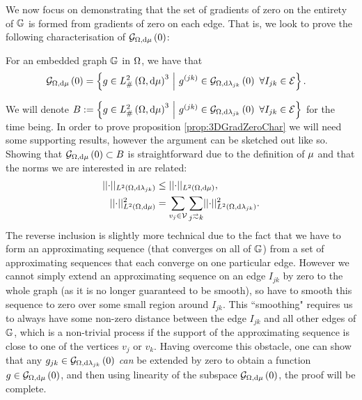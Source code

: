 We now focus on demonstrating that the set of gradients of zero on the entirety of $\mathbb{G}$ is formed from gradients of zero on each edge.
That is, we look to prove the following characterisation of $\mathcal{G}_{ \Omega, \mathrm{d}\mu}\left( 0 \right)$:
\begin{prop} \label{prop:3DGradZeroChar}
	For an embedded graph $\mathbb{G}$ in $\Omega$, we have that
	\begin{align*}
		\mathcal{G}_{ \Omega, \mathrm{d}\mu}\left( 0 \right) &= \left\{  g\in L^2_{\#}\left( \Omega,\mathrm{d} \mu \right)^3 \ \middle\vert \  g^{(jk)}\in\mathcal{G}_{ \Omega, \mathrm{d}\lambda_{jk}}\left( 0 \right) \ \forall I_{jk}\in\mathcal{E}  \right\}.
	\end{align*}
\end{prop}
We will denote $B := \left\{  g\in L^2_{\#}\left( \Omega,\mathrm{d} \mu \right)^3 \ \middle\vert \  g^{(jk)}\in\mathcal{G}_{ \Omega, \mathrm{d}\lambda_{jk}}\left( 0 \right) \ \forall I_{jk}\in\mathcal{E}  \right\}$ for the time being.
In order to prove proposition \ref{prop:3DGradZeroChar} we will need some supporting results, however the argument can be sketched out like so.
Showing that $\mathcal{G}_{ \Omega, \mathrm{d}\mu}\left( 0 \right)\subset B$ is straightforward due to the definition of $\mu$ and that the norms we are interested in are related:
\begin{align*}
	\norm{\cdot}_{\ltwo{\ddom}{\lambda_{jk}}} &\leq \norm{\cdot}_{\ltwo{\ddom}{\ddmes}}, \\
	\norm{\cdot}_{\ltwo{\ddom}{\ddmes}}^2 &= \sum_{v_j\in\vertSet}\sum_{j\conLeft k}\norm{\cdot}_{\ltwo{\ddom}{\lambda_{jk}}}^2.
\end{align*}
The reverse inclusion is slightly more technical due to the fact that we have to form an approximating sequence (that converges on all of $\mathbb{G}$) from a set of approximating sequences that each converge on one particular edge.
However we cannot simply extend an approximating sequence on an edge $I_{jk}$ by zero to the whole graph (as it is no longer guaranteed to be smooth), so have to smooth this sequence to zero over some small region around $I_{jk}$.
This ``smoothing" requires us to always have some non-zero distance between the edge $I_{jk}$ and all other edges of $\mathbb{G}$, which is a non-trivial process if the support of the approximating sequence is close to one of the vertices $v_j$ or $v_k$.
Having overcome this obstacle, one can show that any $g_{jk}\in\mathcal{G}_{ \Omega, \mathrm{d}\lambda_{jk}}\left( 0 \right)$ \emph{can} be extended by zero to obtain a function $g\in\mathcal{G}_{ \Omega, \mathrm{d}\mu}\left( 0 \right)$, and then using linearity of the subspace $\mathcal{G}_{ \Omega, \mathrm{d}\mu}\left( 0 \right)$, the proof will be complete.

